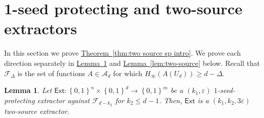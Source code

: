 \documentclass[11pt]{article}
\numberwithin{equation}{section}
\newtheorem{lemma}[theorem]{Lemma}
\theoremstyle{definition}
\theoremstyle{plain}
\newcommand{\expref}[2]{\hyperref[#2]{#1~\ref{#2}}}
\newcommand{\ext}{\mathsf{Ext}}
\newcommand{\advfam}{\mathcal{A}}
\newcommand{\eps}{\varepsilon}
\newcommand{\me}{{H_{\infty}}}
\newcommand{\set}[1]{\left\{{#1}\right\}}
\newcommand{\B}{\set{0,1}}
\newcommand{\advfampart}{\mathcal{F}}
\begin{document}
\section{1-seed protecting and two-source extractors}\label{sec:two source}

In this section we prove \expref{Theorem}{thm:two source sp intro}. We prove each direction separately in \expref{Lemma}{lem: sp is ts} and \expref{Lemma}{lem:two-source} below. Recall that $\mathcal{F}_{\Delta}$ is the set of functions $A \in \advfam_d$ for which $\me(A(U_d)) \ge d-\Delta$.

\begin{lemma}\label{lem: sp is ts}
Let  $\ext \colon \B^{n} \times \B^{d} \rightarrow \B^{m}$ be a $(k_1,\eps)$ $1$-seed-protecting extractor against $\advfampart_{d-k_2}$ for $k_2\leq d-1$. Then, $\ext$ is a $(k_1,k_2, 3\eps)$ two-source extractor.
\end{lemma}
%
\end{document}
